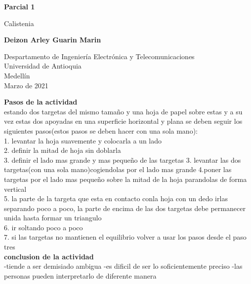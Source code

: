 \documentclass{article}
\begin{document}
\begin{titlepage}
    \begin{center}
        \vspace*{1cm}
            
        \Huge
        \textbf{Parcial 1}
            
        \vspace{0.5cm}
        \LARGE
        Calistenia
            
        \vspace{1.5cm}
            
        \textbf{Deizon Arley Guarin Marin}
            
        \vfill
            
        \vspace{0.8cm}
            
        \Large
        Despartamento de Ingeniería Electrónica y Telecomunicaciones\\
        Universidad de Antioquia\\
        Medellín\\
        Marzo de 2021
            
    \end{center}
\end{titlepage}


\newpage
\textbf{Pasos de la actividad}\\
estando dos targetas del mismo tamaño y una hoja de papel sobre estas y a su vez
estas dos apoyadas en una superficie horizontal y plana se deben seguir los siguientes pasos(estos pasos se deben hacer con una sola mano):\\
1. levantar la hoja suavemente y colocarla a un lado\\
2. definir la mitad de hoja sin doblarla\\
3. definir el lado mas grande y mas pequeño de las targetas  
3. levantar las dos targetas(con una sola mano)cogiendolas por el lado mas grande
4.poner las targetas por el lado mas pequeño sobre la mitad de la hoja parandolas de forma vertical\\
5. la parte de la targeta que esta en contacto conla hoja con un dedo irlas separando poco a poco, la parte de encima de las dos targetas debe permanecer unida hasta formar un triangulo\\
6. ir soltando poco a poco\\
7. si las targetas no mantienen el equilibrio volver  a usar los pasos desde el paso tres\\

\textbf{conclusion de la actividad}\\
-tiende a ser demisiado ambigua 
-es dificil de ser lo soficientemente preciso
-las personas pueden interpretarlo de diferente manera
\end{document}
